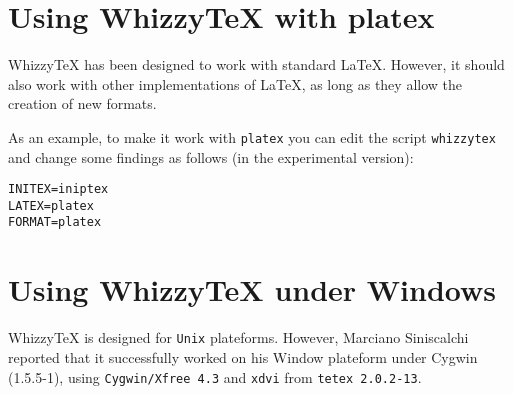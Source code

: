 \documentclass{article}
\def \WhizzyTeX{Whizzy\TeX}
\let \lst \verb
\begin{document}
\section {Using {\WhizzyTeX} with platex}

{\WhizzyTeX} has been designed to work with standard LaTeX.
However, it should also work  with other implementations of LaTeX, as long
as they allow the creation of new formats. 

As an example, to make it work with \lst"platex" you can edit 
the script \lst"whizzytex" and change some findings as follows
(in the experimental version): 
\begin{verbatim}
INITEX=iniptex
LATEX=platex
FORMAT=platex
\end{verbatim}

\hypertarget{cygwin}{}
\section {Using {\WhizzyTeX} under Windows}


{\WhizzyTeX} is designed for \lst"Unix" plateforms.  However, Marciano
Siniscalchi reported that it successfully worked on his
Window plateform under Cygwin (1.5.5-1), using \texttt{Cygwin/Xfree 4.3} and
\texttt{xdvi} from \texttt{tetex 2.0.2-13}.
\end{document}
